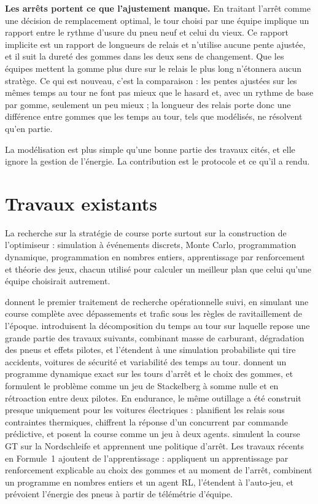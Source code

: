 \documentclass[11pt,a4paper]{article}
\begin{document}
\textbf{Les arrêts portent ce que l'ajustement manque.} En traitant l'arrêt
comme une décision de remplacement optimal, le tour choisi par une équipe
implique un rapport entre le rythme d'usure du pneu neuf et celui du vieux. Ce
rapport implicite est un rapport de longueurs de relais et n'utilise aucune
pente ajustée, et il suit la dureté des gommes dans les deux sens de
changement. Que les équipes mettent la gomme plus dure sur le relais le plus
long n'étonnera aucun stratège. Ce qui est nouveau, c'est la comparaison : les
pentes ajustées sur les mêmes temps au tour ne font pas mieux que le hasard et,
avec un rythme de base par gomme, seulement un peu mieux ; la longueur des
relais porte donc une différence entre gommes que les temps au tour, tels que
modélisés, ne résolvent qu'en partie.

La modélisation est plus simple qu'une bonne partie des travaux cités, et elle
ignore la gestion de l'énergie. La contribution est le protocole et ce qu'il a
rendu.

\section{Travaux existants}

La recherche sur la stratégie de course porte surtout sur la construction de
l'optimiseur : simulation à événements discrets, Monte Carlo, programmation
dynamique, programmation en nombres entiers, apprentissage par renforcement et
théorie des jeux, chacun utilisé pour calculer un meilleur plan que celui qu'une
équipe choisirait autrement.

\citet{bekker2009} donnent le premier traitement de recherche opérationnelle
suivi, en simulant une course complète avec dépassements et trafic sous les
règles de ravitaillement de l'époque. \citet{heilmeier2018} introduisent la
décomposition du temps au tour sur laquelle repose une grande partie des
travaux suivants, combinant masse de carburant, dégradation des pneus et effets
pilotes, et \citet{heilmeier2020mc} l'étendent à une simulation probabiliste qui
tire accidents, voitures de sécurité et variabilité des temps au tour.
\citet{carrasco2022} donnent un programme dynamique exact sur les tours d'arrêt
et le choix des gommes, et \citet{aguad2024} formulent le problème comme un jeu
de Stackelberg à somme nulle et en rétroaction entre deux pilotes. En endurance,
le même outillage a été construit presque uniquement pour les voitures
électriques : \citet{vankampen2022} planifient les relais sous contraintes
thermiques, \citet{vankampen2024} chiffrent la réponse d'un concurrent par
commande prédictive, et \citet{devries2026} posent la course comme un jeu à deux
agents. \citet{boettinger2023} simulent la course GT sur la Nordschleife et
apprennent une politique d'arrêt. Les travaux récents en Formule~1 ajoutent de
l'apprentissage : \citet{thomas2025} appliquent un apprentissage par
renforcement explicable au choix des gommes et au moment de l'arrêt,
\citet{fieni2025} combinent un programme en nombres entiers et un agent RL,
\citet{fieni2026} l'étendent à l'auto-jeu, et \citet{todd2025} prévoient
l'énergie des pneus à partir de télémétrie d'équipe.
\end{document}
